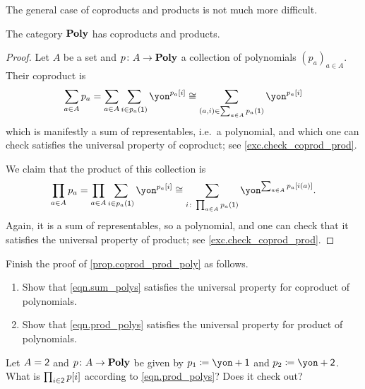 \documentclass[Book-Poly]{subfiles}
\begin{document}
The general case of coproducts and products is not much more difficult.

\begin{proposition}\label{prop.coprod_prod_poly}
The category $\mathbf{Poly}$ has coproducts and products.
\end{proposition}
\begin{proof}
Let $A$ be a set and $p\colon A\to\mathbf{Poly}$ a collection of polynomials $(p_a)_{a\in A}$.%
Their coproduct is
\begin{equation}\label{eqn.sum_polys}
\sum_{a\in A}p_a=\sum_{a\in A}\sum_{i\in p_a(\1)}\yon^{p_a[i]}\cong\sum_{(a,i)\in\sum_{a\in A}p_a(\1)}\yon^{p_a[i]}
\end{equation}
which is manifestly a sum of representables, i.e.\ a polynomial, and which one can check satisfies the universal property of coproduct; see \cref{exc.check_coprod_prod}.

We claim that the product of this collection is
\begin{equation}\label{eqn.prod_polys}
\prod_{a\in A}p_a=
\prod_{a\in A}\sum_{i\in p_a(\1)}\yon^{p_a[i]}\cong
\sum_{i\colon \prod_{a\in A}p_a(\1)}\yon^{\sum_{a\in A}p_a[i(a)]}.
\end{equation}
Again, it is a sum of representables, so a polynomial, and one can check that it satisfies the universal property of product; see \cref{exc.check_coprod_prod}.
\end{proof}

\begin{exercise}\label{exc.check_coprod_prod}
Finish the proof of \cref{prop.coprod_prod_poly} as follows.
\begin{enumerate}
	\item Show that \eqref{eqn.sum_polys} satisfies the universal property for coproduct of polynomials.
	\item Show that \eqref{eqn.prod_polys} satisfies the universal property for product of polynomials.
\qedhere
\end{enumerate}
\end{exercise}

\begin{exercise}
Let $A=\textsf{2}$ and $p\colon A\to\mathbf{Poly}$ be given by $p_1\coloneqq\yon+\1$ and $p_2\coloneqq\yon+\2$. What is $\prod_{i\in\textsf{2}}p[i]$ according to \eqref{eqn.prod_polys}? Does it check out?
\end{exercise}
\end{document}
